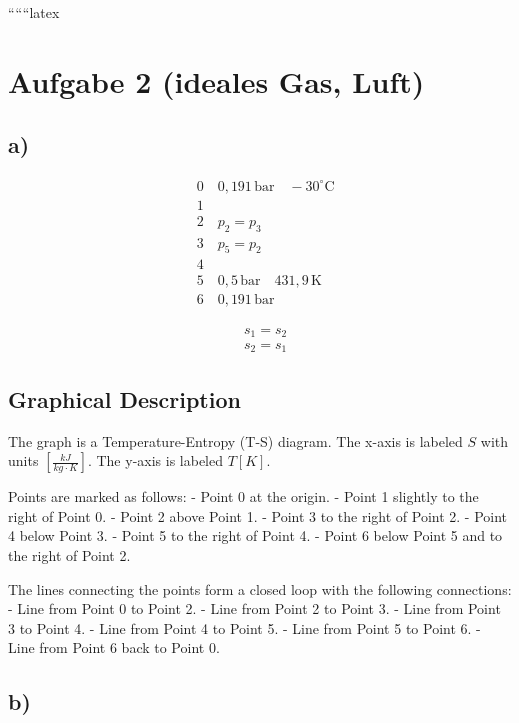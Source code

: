 
``````latex


\section*{Aufgabe 2 (ideales Gas, Luft)}

\subsection*{a)}

\begin{align*}
&0 \quad 0,191 \, \text{bar} \quad -30^\circ \text{C} \\
&1 \\
&2 \quad p_2 = p_3 \\
&3 \quad p_5 = p_2 \\
&4 \\
&5 \quad 0,5 \, \text{bar} \quad 431,9 \, \text{K} \\
&6 \quad 0,191 \, \text{bar}
\end{align*}

\begin{align*}
&s_1 = s_2 \\
&s_2 = s_1
\end{align*}

\subsection*{Graphical Description}

The graph is a Temperature-Entropy (T-S) diagram. The x-axis is labeled $S$ with units $[\frac{kJ}{kg \cdot K}]$. The y-axis is labeled $T [K]$. 

Points are marked as follows:
- Point 0 at the origin.
- Point 1 slightly to the right of Point 0.
- Point 2 above Point 1.
- Point 3 to the right of Point 2.
- Point 4 below Point 3.
- Point 5 to the right of Point 4.
- Point 6 below Point 5 and to the right of Point 2.

The lines connecting the points form a closed loop with the following connections:
- Line from Point 0 to Point 2.
- Line from Point 2 to Point 3.
- Line from Point 3 to Point 4.
- Line from Point 4 to Point 5.
- Line from Point 5 to Point 6.
- Line from Point 6 back to Point 0.

\subsection*{b)}

